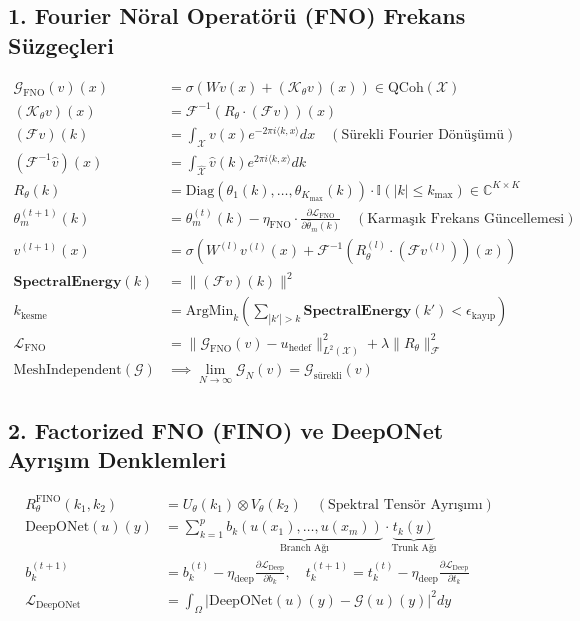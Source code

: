 \documentclass[11pt, a4paper]{article}
\begin{document}
\subsection{1. Fourier Nöral Operatörü (FNO) Frekans Süzgeçleri}
\begin{align}
\mathcal{G}_{\text{FNO}}(v)(x) &= \sigma\left( W v(x) + (\mathcal{K}_\theta v)(x) \right) \in \text{QCoh}(\mathcal{X}) \\
(\mathcal{K}_\theta v)(x) &= \mathcal{F}^{-1} \left( R_\theta \cdot (\mathcal{F} v) \right)(x) \\
(\mathcal{F} v)(k) &= \int_{\mathcal{X}} v(x) e^{-2\pi i \langle k, x \rangle} dx \quad (\text{Sürekli Fourier Dönüşümü}) \\
(\mathcal{F}^{-1} \hat{v})(x) &= \int_{\hat{\mathcal{X}}} \hat{v}(k) e^{2\pi i \langle k, x \rangle} dk \\
R_\theta(k) &= \text{Diag}(\theta_1(k), \dots, \theta_{K_{\max}}(k)) \cdot \mathbb{I}(|k| \le k_{\text{max}}) \in \mathbb{C}^{K \times K} \\
\theta_m^{(t+1)}(k) &= \theta_m^{(t)}(k) - \eta_{\text{FNO}} \cdot \frac{\partial \mathcal{L}_{\text{FNO}}}{\partial \bar{\theta}_m(k)} \quad (\text{Karmaşık Frekans Güncellemesi}) \\
v^{(l+1)}(x) &= \sigma\left( W^{(l)} v^{(l)}(x) + \mathcal{F}^{-1} \left( R_\theta^{(l)} \cdot (\mathcal{F} v^{(l)}) \right)(x) \right) \\
\mathbf{SpectralEnergy}(k) &= \| (\mathcal{F} v)(k) \|^2 \\
k_{\text{kesme}} &= \text{ArgMin}_k \left( \sum_{|k'|>k} \mathbf{SpectralEnergy}(k') < \epsilon_{\text{kayıp}} \right) \\
\mathcal{L}_{\text{FNO}} &= \| \mathcal{G}_{\text{FNO}}(v) - u_{\text{hedef}} \|_{L^2(\mathcal{X})}^2 + \lambda \| R_\theta \|_{\mathcal{F}}^2 \\
\text{MeshIndependent}(\mathcal{G}) &\implies \lim_{N \to \infty} \mathcal{G}_N(v) = \mathcal{G}_{\text{sürekli}}(v)
\end{align}

\subsection{2. Factorized FNO (FINO) ve DeepONet Ayrışım Denklemleri}
\begin{align}
R_\theta^{\text{FINO}}(k_1, k_2) &= U_\theta(k_1) \otimes V_\theta(k_2) \quad (\text{Spektral Tensör Ayrışımı}) \\
\text{DeepONet}(u)(y) &= \sum_{k=1}^p \underbrace{b_k(u(x_1), \dots, u(x_m))}_{\text{Branch Ağı}} \cdot \underbrace{t_k(y)}_{\text{Trunk Ağı}} \\
b_k^{(t+1)} &= b_k^{(t)} - \eta_{\text{deep}} \frac{\partial \mathcal{L}_{\text{Deep}}}{\partial b_k}, \quad t_k^{(t+1)} = t_k^{(t)} - \eta_{\text{deep}} \frac{\partial \mathcal{L}_{\text{Deep}}}{\partial t_k} \\
\mathcal{L}_{\text{DeepONet}} &= \int_{\Omega} \left| \text{DeepONet}(u)(y) - \mathcal{G}(u)(y) \right|^2 dy
\end{align}
\end{document}
